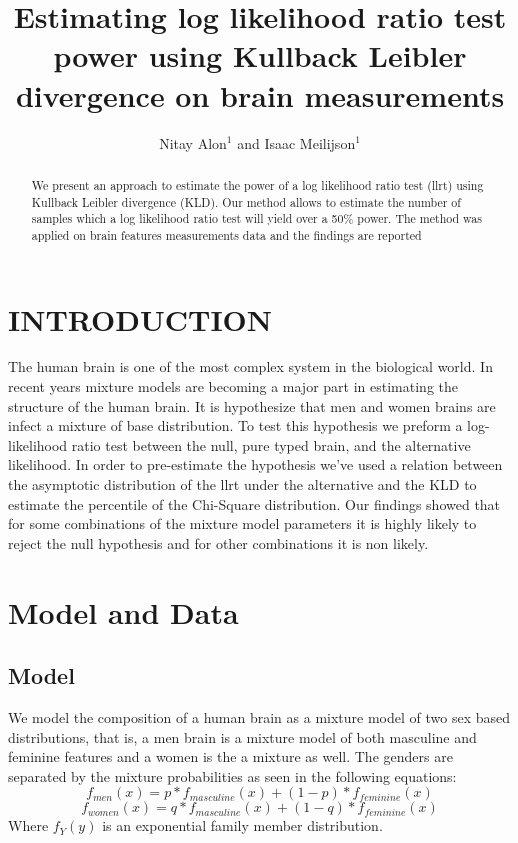 \documentclass[a4paper, 10pt, conference]{ieeeconf}      %
\title{\LARGE \bf
Estimating log likelihood ratio test power using Kullback Leibler divergence on brain measurements 
}
\author{Nitay Alon$^{1}$ and Isaac Meilijson$^{1}$%
}
\begin{document}
\maketitle
\thispagestyle{empty}
\pagestyle{empty}


\begin{abstract}

We present an approach to estimate the power of a log likelihood ratio test (llrt) using Kullback Leibler divergence (KLD). Our method allows to estimate the number of samples which a log likelihood ratio test will yield over a 50\% power. The method was applied on brain features measurements data and the findings are reported
\end{abstract}


\section{INTRODUCTION}

The human brain is one of the most complex system in the biological world. In recent years mixture models are becoming a major part in estimating the structure of the human brain. It is hypothesize that men and women brains are infect a mixture of base distribution. To test this hypothesis we preform a log-likelihood ratio test between the null, pure typed brain, and the alternative likelihood. %
In order to pre-estimate the hypothesis we've used a relation between the asymptotic distribution of the llrt under the alternative and the KLD to estimate the percentile of the Chi-Square distribution.
Our findings showed that for some combinations of the mixture model parameters it is highly likely to reject the null hypothesis and for other combinations it is non likely.

\section{Model and Data}

\subsection{Model}
We model the composition of a human brain as a mixture model of two sex based distributions, that is, a men brain is a mixture model of both masculine and feminine features and a women is the a mixture as well. 
The genders are separated by the mixture probabilities as seen in the following equations:
\begin{equation}
f_{men}(x) = p * f_{masculine}(x) + (1-p) * f_{feminine}(x) 
\end{equation}
\begin{equation}
f_{women}(x) = q * f_{masculine}(x) + (1-q) * f_{feminine}(x)
\end{equation}
Where $f_Y(y)$ is an exponential family member distribution.
\end{document}
